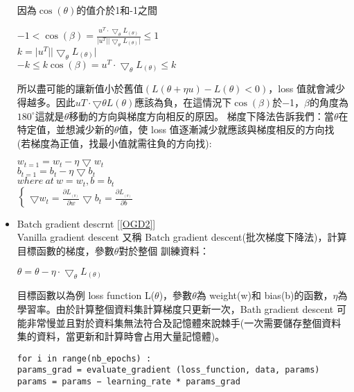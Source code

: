 \begin{itemize}
\begin{center}
\end{center}
因為$\cos(\theta)$的值介於1和-1之間\\
\begin{center}
$-1<\cos(\beta)=\frac{u^{T}\cdot\bigtriangledown_{\theta} L_{(\theta)}}{\vert u^{T}\vert\vert \bigtriangledown_{\theta} L_{(\theta)}\vert}\leq 1$\\
$k=\vert u^{T}\vert\vert \bigtriangledown_{\theta} L_{(\theta)}\vert$\\
$-k \leq k\cos(\beta)=u^{T}\cdot\bigtriangledown_{\theta} L_{(\theta)}\leq k$
\end{center}
\newpage
 所以盡可能的讓新值小於舊值$(L(\theta+\eta u) − L(\theta) < 0)$，loss 值就會減少得越多。因此$u T \cdot \bigtriangledown\theta L(\theta)$應該為負，在這情況下$\cos(\beta)$於−1，$\beta$的角度為 $180^{\circ}$這就是$\theta$移動的方向與梯度方向相反的原因。 梯度下降法告訴我們：當$\theta$在特定值，並想減少新的$\theta$值，使 loss 值逐漸減少就應該與梯度相反的方向找 (若梯度為正值，找最小值就需往負的方向找):
\begin{center}
$w_{t=1}=w_t-\eta\bigtriangledown w_t$\\
$b_{t=1}=b_t-\eta\bigtriangledown b_t$\\
$where\ at\ w=w_t,b=b_t$\\
$\begin{cases}
 \bigtriangledown w_t=\frac{\partial L_{_{(\theta)}}}{\partial w}
 \bigtriangledown b_t=\frac{\partial L_{_{(\theta)}}}{\partial b}
 \end{cases}$
\end{center}
\item Batch gradient descrnt [\ref{OGD2}]\\
 Vanilla gradient descent 又稱 Batch gradient descent(批次梯度下降法)，計算目標函數的梯度，參數$\theta$對於整個 訓練資料：
\begin{center}
$\theta=\theta-\eta\cdot\bigtriangledown_{\theta}L_{(\theta)}$
\end{center}
 目標函數以為例 loss function L($\theta$)，參數$\theta$為 weight(w)和 bias(b)的函數，$\eta$為學習率。由於計算整個資料集計算梯度只更新一次，Bath gradient descent 可能非常慢並且對於資料集無法符合及記憶體來說棘手(一次需要儲存整個資料集的資料，當更新和計算時會占用大量記憶體)。\\
\begin{lstlisting}[caption=\Large Batch gradient descrnt]
 for i in range(nb_epochs) :
params_grad = evaluate_gradient (loss_function, data, params)
params = params − learning_rate * params_grad
\end{lstlisting}

\end{itemize}
